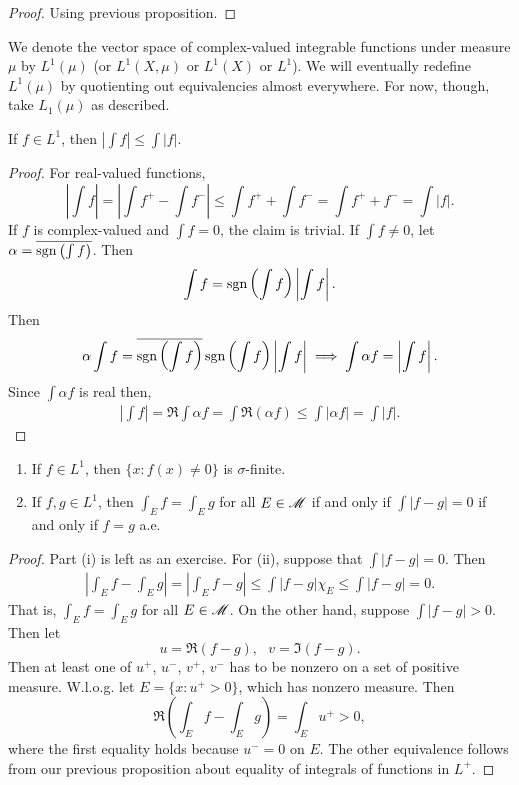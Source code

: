 \documentclass[12pt]{article} %
\begin{document}
\begin{proof}
    Using previous proposition.
\end{proof}

We denote the vector space of complex-valued integrable functions under measure $\mu$ by $L^1(\mu)$ (or $L^1(X, \mu)$ or $L^1(X)$ or $L^1$). We will eventually redefine $L^1(\mu)$ by quotienting out equivalencies almost everywhere. For now, though, take $L_1(\mu)$ as described.

\begin{proposition}
    If $f \in L^1$, then $\left| \int f \right| \leq \int |f|$.
\end{proposition}

\begin{proof}
    For real-valued functions, \[\left|\int f\right| = \left| \int f^+ - \int f^-\right| \leq \int f^+ + \int f^- = \int f^+ + f^- = \int |f|.\] If $f$ is complex-valued and $\int f = 0$, the claim is trivial. If $\int f \neq 0$, let $\alpha = \overline{\operatorname{sgn} \left(\int f\right)}$. Then \[\int f = \operatorname{sgn} \left(\int f \right) \left|\int f\right|.\] Then \[\alpha \int f = \overline{\operatorname{sgn} \left(\int f\right)} \operatorname{sgn} \left(\int f \right) \left|\int f\right| \implies \int \alpha f = \left|\int f\right|.\] Since $\int \alpha f$ is real then, \begin{align*}
        \left|\int f\right| = \Re \int \alpha f = \int \Re(\alpha f) \leq \int |\alpha f| = \int |f|.
    \end{align*}
\end{proof}

\begin{proposition}
    \begin{enumerate}
        \item If $f \in L^1$, then $\{x : f(x) \neq 0\}$ is $\sigma$-finite.
        \item If $f, g \in L^1$, then $\int_E f = \int_E g$ for all $E \in \mathscr{M}$ if and only if $\int |f - g| = 0$ if and only if $f = g$ a.e.
    \end{enumerate}
\end{proposition}

\begin{proof}
    Part (i) is left as an exercise. For (ii), suppose that $\int |f - g| = 0$. Then \begin{align*}
        \left| \int_E f - \int_E g \right| = \left|\int_E f-g\right| \leq \int |f-g| \chi_E \leq \int |f-g| = 0.
    \end{align*} That is, $\int_E f = \int_E g$ for all $E \in \mathscr{M}$. On the other hand, suppose $\int |f - g| > 0$. Then let \[u = \Re(f-g), \ \ \ v = \Im (f-g).\] Then at least one of $u^+$, $u^-$, $v^+$, $v^-$ has to be nonzero on a set of positive measure. W.l.o.g. let $E = \{x : u^+ > 0\}$, which has nonzero measure. Then \[\Re\left(\int_E f - \int_E g\right) = \int_E u^+ > 0,\] where the first equality holds because $u^- = 0$ on $E$. The other equivalence follows from our previous proposition about equality of integrals of functions in $L^+$. 
\end{proof}
\end{document}

